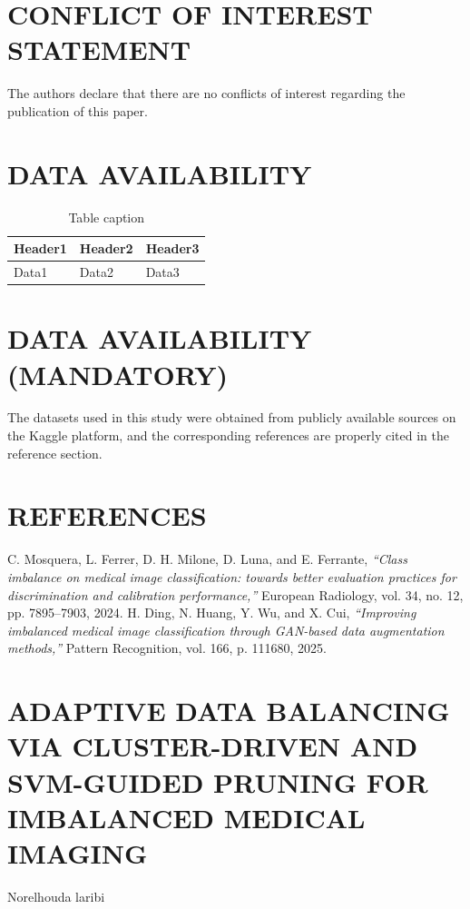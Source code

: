 \documentclass[final,5p,times,twocolumn,authoryear]{elsarticle}
\begin{document}
\section{CONFLICT OF INTEREST STATEMENT}
The authors declare that there are no conflicts of interest regarding the publication of this paper.
\section{DATA AVAILABILITY}
\begin{table}[htbp]
\centering
\caption{Table caption}
\begin{tabular}{lll}
\hline
Header1 & Header2 & Header3 \\
\hline
Data1 & Data2 & Data3 \\
\hline
\end{tabular}
\end{table}

\section{DATA AVAILABILITY (MANDATORY)}
The datasets used in this study were obtained from publicly available sources on the Kaggle platform,
and the corresponding references are properly cited in the reference section.
\section{REFERENCES}
C. Mosquera, L. Ferrer, D. H. Milone, D. Luna, and E. Ferrante, \textit{“Class imbalance on medical image classification: towards better evaluation practices for discrimination and calibration performance,”} European Radiology, vol. 34, no. 12, pp. 7895–7903, 2024.
H. Ding, N. Huang, Y. Wu, and X. Cui, \textit{“Improving imbalanced medical image classification through GAN-based data augmentation methods,”} Pattern Recognition, vol. 166, p. 111680, 2025.
\section{ADAPTIVE DATA BALANCING VIA CLUSTER-DRIVEN AND SVM-GUIDED PRUNING FOR IMBALANCED MEDICAL IMAGING}
Norelhouda laribi
\end{document}
